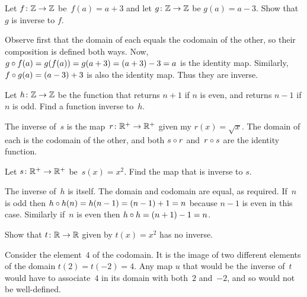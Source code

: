 \documentclass{test}  %
\begin{document}
\begin{problem} 
\begin{exes}
\begin{exercise} 
  Let $\mbox{$f\colon \mathbb{Z}\to \mathbb{Z}$}$ be~$f(a)=a+3$ and let
  $\mbox{$g\colon \mathbb{Z}\to \mathbb{Z}$}$ be $g(a)=a-3$.
  Show that $g$ is inverse to $f$.
\end{exercise}
\begin{answer}
  Observe first that the domain of each equals the codomain of the other,
  so their composition is defined both ways.
  Now, $g\mathbin{\circ} f(a)=g(f(a))=g(a+3)=(a+3)-3=a$
  is the identity map.
  Similarly, $f\mathbin{\circ} g(a)=(a-3)+3$ is also the identity map.
  Thus they are inverse.  
\end{answer}
\begin{exercise} 
  Let $\mbox{$h\colon \mathbb{Z}\to \mathbb{Z}$}$ be the function that returns
  $n+1$ if $n$ is even, and returns $n-1$ if $n$ is odd.
  Find a function inverse to~$h$.
\end{exercise}
\begin{answer}
  The inverse of~$s$ is the map~$\mbox{$r\colon \mathbb{R}^+\to \mathbb{R}^+$}$ given my 
  $r(x)=\sqrt{x}$.
  The domain of each is the codomain of the other,
  and both $s\mathbin{\circ} r$ and~$r\mathbin{\circ} s$ are the identity function.  
\end{answer}
\begin{exercise} 
  Let $\mbox{$s\colon \mathbb{R}^+\to \mathbb{R}^+$}$ be~$s(x)=x^2$.
  Find the map that is inverse to $s$.
\end{exercise}
\begin{answer}
  The inverse of~$h$ is itself.
  The domain and codomain are equal, as required. 
  If~$n$ is odd then $h\mathbin{\circ} h(n)=h(n-1)=(n-1)+1=n$ because 
  $n-1$ is even in this case.
  Similarly if~$n$ is even then $h\mathbin{\circ} h=(n+1)-1=n$.  
\end{answer}
\begin{exercise} 
  Show that $\mbox{$t\colon \mathbb{R}\to \mathbb{R}$}$ given by $t(x)=x^2$
  has no inverse.
\end{exercise}
\begin{answer}
  Consider the element~$4$ of the codomain.
  It is the image of two different elements of the domain
  $t(2)=t(-2)=4$. 
  Any map $u$ that would be the inverse of~$t$ would have to associate~$4$ 
  in its domain with both~$2$ and~$-2$, and so would not be well-defined.  
\end{answer}
\end{exes}

\end{problem}
\end{document}
